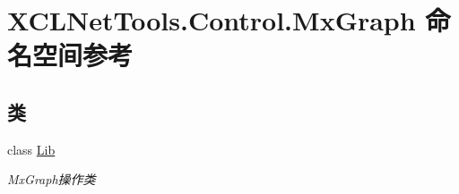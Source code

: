 \hypertarget{namespace_x_c_l_net_tools_1_1_control_1_1_mx_graph}{}\section{X\+C\+L\+Net\+Tools.\+Control.\+Mx\+Graph 命名空间参考}
\label{namespace_x_c_l_net_tools_1_1_control_1_1_mx_graph}
\subsection*{类}
\begin{DoxyCompactItemize}
\item 
class \hyperlink{class_x_c_l_net_tools_1_1_control_1_1_mx_graph_1_1_lib}{Lib}
\begin{DoxyCompactList}\small\item\em Mx\+Graph操作类 \end{DoxyCompactList}\end{DoxyCompactItemize}
